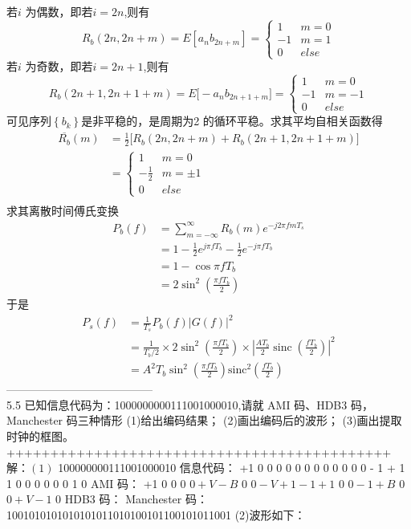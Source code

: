 \documentclass[utf8]{article}
\begin{document}
若$i$ 为偶数，即若$i=2n$,则有
$$R_{b}\left(2n,2n+m\right)=E\left[a_{n}b_{2n+m}\right]=\begin{cases}1&m=0\\-1&m=1\\0&else\end{cases}$$
若$i$ 为奇数，即若$i=2n+1$,则有
$$R_{b}\left(2n+1,2n+1+m\right)=E\Big[-a_{n}b_{2n+1+m}\Big]=\begin{cases}1&m=0\\-1&m=-1\\0&else\end{cases}$$
可见序列$\left\{b_k\right\}$是非平稳的，是周期为2 的循环平稳。求其平均自相关函数得
$$\begin{aligned}\overline{R_{b}}\left(m\right)&=\frac{1}{2}\Big[R_{b}\left(2n,2n+m\right)+R_{b}\left(2n+1,2n+1+m\right)\Big]\\&=\begin{cases}1&m=0\\-\frac{1}{2}&m=\pm1\\0&else\end{cases}\\\end{aligned}$$
求其离散时间傅氏变换
$$\begin{aligned}P_{b}\left(f\right)&=\sum_{m=-\infty}^{\infty}R_{b}\left(m\right)e^{-j2\pi fmT_{s}}\\&=1-\frac{1}{2}e^{j\pi fT_{b}}-\frac{1}{2}e^{-j\pi fT_{b}}\\&=1-\cos\pi fT_{b}\\&=2\sin^{2}\left(\frac{\pi fT_{b}}{2}\right)\end{aligned}$$
于是
$$\begin{aligned}P_{s}\left(f\right)&=\frac{1}{T_{s}}P_{b}\left(f\right)\left|G\left(f\right)\right|^{2}\\&=\frac{1}{T_{b}/2}\times2\sin^{2}\left(\frac{\pi fT_{b}}{2}\right)\times\left|\frac{AT_{b}}{2}\operatorname{sinc}\left(\frac{fT_{b}}{2}\right)\right|^{2}\\&=A^{2}T_{b}\sin^{2}\left(\frac{\pi fT_{b}}{2}\right)\mathrm{sinc}^{2}\left(\frac{fT_{b}}{2}\right)\end{aligned}$$
---------------------------------------\\
5.5 已知信息代码为：1000000000111001000010,请就 AMI 码、HDB3 码，
Manchester 码三种情形
(1)给出编码结果；
(2)画出编码后的波形； (3)画出提取时钟的框图。
++++++++++++++++++++++++++++++++++++++++++++\\
$解：(1)$
100000000111001000010
信息代码：
+1 0 0 0 0 0 0 0 0 0 0 0 0 - 1 + 1 1 0 0 0 0 0 0 1 0
AMI 码：
+1 0 0 0 $0+ V- B$ 0 $0- V+ 1- 1+ 1$ 0 $0- 1+ B$ 0 $0+ V- 1$ 0
HDB3 码：
Manchester 码：1001010101010101011010100101100101011001
(2)波形如下：
\end{document}
